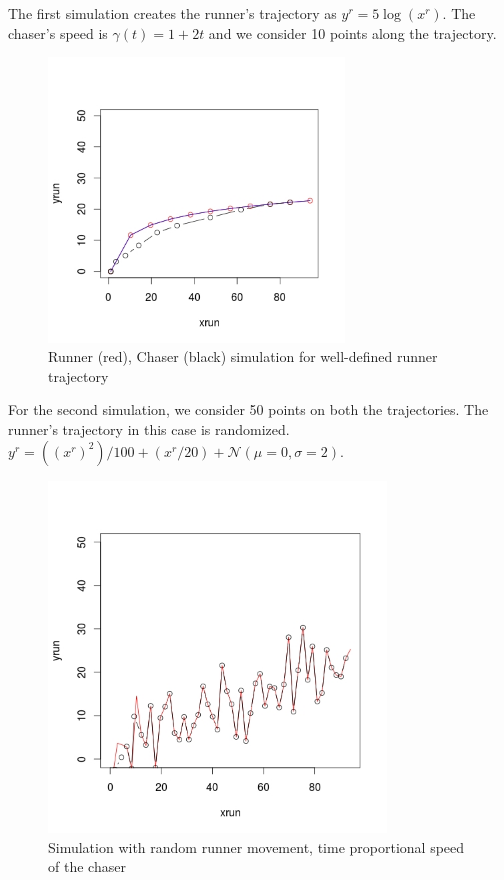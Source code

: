 \documentclass[a4paper,11pt]{article}
\begin{document}
The first simulation creates the runner's trajectory as $y^{r} = 5\log(x^{r})$. The chaser's speed is $\gamma(t) = 1+2t$ and we consider 10 points along the trajectory.

\begin{figure}[H]
\centering
\includegraphics[width=0.7\textwidth]{simulation.jpeg}
\caption{Runner (red), Chaser (black) simulation for well-defined runner trajectory}
\end{figure}

For the second simulation, we consider 50 points on both the trajectories. The runner's trajectory in this case is randomized. $y^{r} = ((x^{r})^2)/100 + (x^{r}/20) + \mathcal{N}(\mu = 0, \sigma = 2)$.
\begin{figure}[H]
\centering
\includegraphics[width=0.8\textwidth]{sim50points.jpeg}
\caption{Simulation with random runner movement, time proportional speed of the chaser}
\end{figure}
\end{document}
